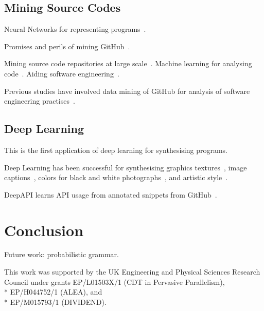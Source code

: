 \documentclass[preprint,nonatbib,10pt,nocopyrightspace]{sigplanconf}
\begin{document}
\subsection{Mining Source Codes}

Neural Networks for representing programs~\cite{Bunel}.

Promises and perils of mining GitHub~\cite{Bird2009}.

Mining source code repositories at large
scale~\cite{Allamanis2013a,White2015a}. Machine learning for analysing
code~\cite{Allamanis2014a,Raychev}. Aiding software
engineering~\cite{Allamanis2014,Bird2015}.

Previous studies have involved data mining of GitHub for analysis of
software engineering
practises~\cite{Wu2014,Guzman2014,Baishakhi2014a,Vasilescu2015}.


\subsection{Deep Learning}

This is the first application of deep learning for synthesising
programs.

Deep Learning has been successful for synthesising graphics
textures~\cite{Gatys2015a}, image captions~\cite{Vinyals}, colors for
black and white photographs~\cite{Zhang2016}, and artistic
style~\cite{Gatys2015}.

DeepAPI learns API usage from annotated snippets from
GitHub~\cite{Zhang2015a}.


\section{Conclusion}\label{sec:conclusion}

Future work: probabilistic grammar.


\acks

This work was supported by the UK Engineering and Physical Sciences
Research Council under grants EP/L01503X/1 (CDT in Pervasive
Parallelism),\\* EP/H044752/1 (ALEA), and\\* EP/M015793/1 (DIVIDEND).


\label{bibliography}
\printbibliography
\end{document}
